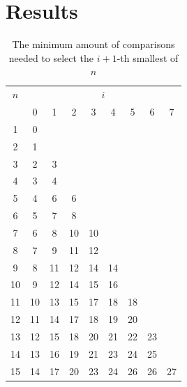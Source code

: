 \documentclass[10pt,journal,compsoc]{IEEEtran}
\begin{document}

\section{Results}

\begin{table}
  \centering
  \begin{tabular}{c|cccccccc}
    $n$ & \multicolumn{8}{c}{$i$}                                    \\
        & 0                       & 1  & 2  & 3  & 4  & 5  & 6  & 7  \\ \hline
    1   & 0                                                          \\
    2   & 1                                                          \\
    3   & 2                       & 3                                \\
    4   & 3                       & 4                                \\
    5   & 4                       & 6  & 6                           \\
    6   & 5                       & 7  & 8                           \\
    7   & 6                       & 8  & 10 & 10                     \\
    8   & 7                       & 9  & 11 & 12                     \\
    9   & 8                       & 11 & 12 & 14 & 14                \\
    10  & 9                       & 12 & 14 & 15 & 16                \\
    11  & 10                      & 13 & 15 & 17 & 18 & 18           \\
    12  & 11                      & 14 & 17 & 18 & 19 & 20           \\
    13  & 12                      & 15 & 18 & 20 & 21 & 22 & 23      \\
    14  & 13                      & 16 & 19 & 21 & 23 & 24 & 25      \\
    15  & 14                      & 17 & 20 & 23 & 24 & 26 & 26 & 27 \\
  \end{tabular}
  \caption{The minimum amount of comparisons needed to select the $i+1$-th smallest of $n$}
  \label{table:num-comparisons}
\end{table}
\end{document}
